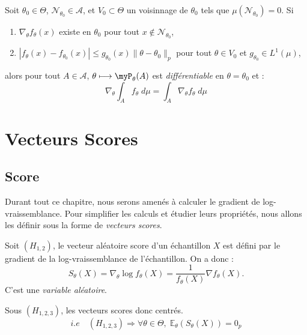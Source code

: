 \begin{rappel}
    Soit $ \theta_0 \in \Theta$, $ \mathcal{N}_{\theta_0} \in \mathcal{A}$, et $V_0 \subset \Theta$ un voisinnage de $ \theta_0$ 
    tels que $ \mu( \mathcal{N}_{\theta_0}) = 0$. Si 
    \begin{enumerate}[label=\roman*)]
        \item $ \nabla_\theta f_\theta(x)$ existe en $ \theta_0$ pour tout $ x \not \in \mathcal{N}_{\theta_0}$, 
        \item $ | f_\theta(x) - f_{\theta_0}(x) | \leqslant g_{\theta_0}(x) \| \theta - \theta_0 \|_p $
            pour tout $ \theta \in V_0$ et $g_{\theta_0} \in L^1( \mu)$, 
    \end{enumerate}
    alors pour tout $A \in \mathcal{A}$, $ \theta \longmapsto \myP_\theta(A)$ est \emph{différentiable} en $ \theta = \theta_0$ 
    et : 
        $$ \nabla_\theta \int_A f_\theta \; d \mu = \int_A \nabla_\theta f_\theta \; d \mu $$
\end{rappel}


\section{Vecteurs Scores}

\subsection{Score}

Durant tout ce chapitre, nous serons amenés à calculer le gradient de log-vraissemblance. 
Pour simplifier les calculs et étudier leurs propriétés, nous allons les définir sous 
la forme de \emph{vecteurs scores}. 

\begin{definition}
    Soit $(H_{1,2})$, le vecteur aléatoire score d'un échantillon $X$ est défini par le gradient de la 
    log-vraissemblance de l'échantillon. On a donc : 
    \begin{equation}
        \boxed{S_\theta(X) = \nabla_\theta \log f_\theta(X) = \frac{1}{f_\theta(X)} \nabla f_\theta(X). }
    \end{equation}
    C'est une \emph{variable aléatoire}. 
\end{definition}

\begin{prop}[Espérance]
    Sous $(H_{1, 2, 3})$, les vecteurs scores donc centrés. 
        $$ i.e \quad (H_{1, 2, 3}) \Longrightarrow \forall \theta \in \Theta, \; \mathbb{E}_\theta(S_\theta(X)) = 0_p $$
\end{prop}

